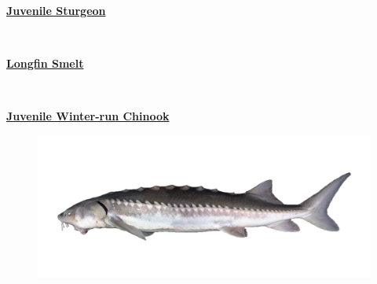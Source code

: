 \documentclass[
]{book}
\begin{document}
\begin{panel-grid}

\begin{columns-nocenter}

\begin{column800}

\textbf{\href{http://calfish.ucdavis.edu/species/?uid=182\&ds=698}{Juvenile Sturgeon}}

\end{column800}

\begin{column40}

~

\end{column40}

\begin{column800}

\textbf{\href{http://calfish.ucdavis.edu/species/?uid=87\&ds=698}{Longfin Smelt}}

\end{column800}

\begin{column40}

~

\end{column40}

\begin{column800}

\textbf{\href{http://calfish.ucdavis.edu/species/?uid=30\&ds=698}{Juvenile Winter-run Chinook}}

\end{column800}

\end{columns-nocenter}

\begin{columns-nocenter}

\begin{column800}

\begin{figure}

{\centering \includegraphics[width=29.17in]{figures/white_sturgeon_adult} 

}
\end{figure}
\end{column800}
\end{columns-nocenter}
\end{panel-grid}
\end{document}
